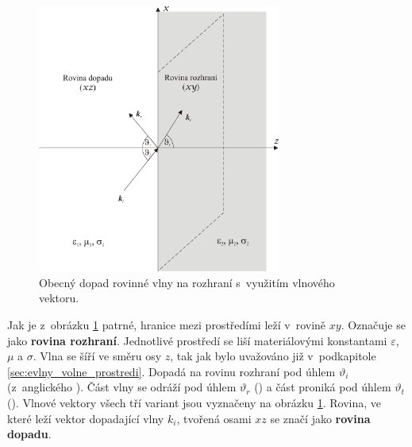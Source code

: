 \begin{figure}[!h]
	\centering
	\includegraphics[width=8cm]{evlny_rovinne_rozhrani.png}
	\caption{Obecný dopad rovinné vlny na rozhraní s~využitím vlnového vektoru.}
	\label{obr:evlny_rovinne_rozhrani}
\end{figure}

Jak je z~obrázku \ref{obr:evlny_rovinne_rozhrani} patrné, hranice mezi prostředími leží v~rovině $xy$. Označuje se jako {\bf rovina rozhraní}. Jednotlivé prostředí se liší materiálovými konstantami $\varepsilon$, $\mu$ a $\sigma$. Vlna se šíří ve směru osy $z$, tak jak bylo uvažováno již v~podkapitole \ref{sec:evlny_volne_prostredi}. Dopadá na rovinu rozhraní pod úhlem $\vartheta_{i}$ (z~anglického ). Část vlny se odráží pod úhlem $\vartheta_{r}$ () a část proniká pod úhlem $\vartheta_{t}$ (). Vlnové vektory všech tří variant jsou vyznačeny na obrázku \ref{obr:evlny_rovinne_rozhrani}. Rovina, ve které leží vektor dopadající vlny $k_{i}$, tvořená osami $xz$ se značí jako {\bf rovina dopadu}.

